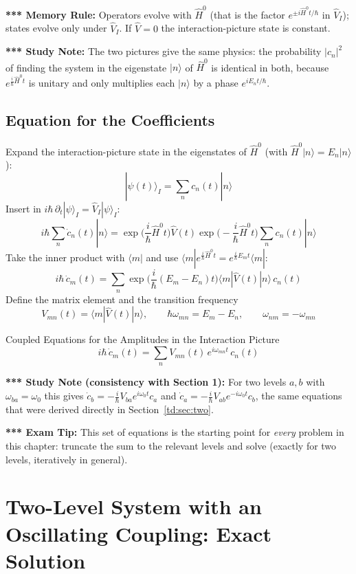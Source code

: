 \documentclass[11pt,a4paper]{article}
\begin{document}
\textbf{*** Memory Rule:} Operators evolve with $\hat H^0$ (that is the factor $e^{\pm i\hat H^0t/\hbar}$ in $\hat V_I$); states evolve only under $\hat V_I$. If $\hat V=0$ the interaction-picture state is constant.

\textbf{*** Study Note:} The two pictures give the same physics: the probability $|c_n|^2$ of finding the system in the eigenstate $|n\rangle$ of $\hat H^0$ is identical in both, because $e^{\frac i\hbar\hat H^0t}$ is unitary and only multiplies each $|n\rangle$ by a phase $e^{iE_nt/\hbar}$.

\subsection{Equation for the Coefficients}
Expand the interaction-picture state in the eigenstates of $\hat H^0$ (with $\hat H^0|n\rangle=E_n|n\rangle$):
\[
|\psi(t)\rangle_I = \sum_nc_n(t)|n\rangle
\]
Insert in $i\hbar\,\partial_t|\psi\rangle_I=\hat V_I|\psi\rangle_I$:
\[
i\hbar\sum_n\dot c_n(t)|n\rangle = \exp\Big(\frac i\hbar\hat H^0t\Big)\hat V(t)\exp\Big(-\frac i\hbar\hat H^0t\Big)\sum_nc_n(t)|n\rangle
\]
Take the inner product with $\langle m|$ and use $\langle m|e^{\frac i\hbar\hat H^0t}=e^{\frac i\hbar E_mt}\langle m|$:
\[
i\hbar\,\dot c_m(t) = \sum_n\exp\Big(\frac i\hbar(E_m-E_n)t\Big)\langle m|\hat V(t)|n\rangle\,c_n(t)
\]
Define the matrix element and the transition frequency
\[
V_{mn}(t)=\langle m|\hat V(t)|n\rangle, \qquad \hbar\omega_{mn}=E_m-E_n, \qquad \omega_{nm}=-\omega_{mn}
\]
\begin{thm}{Coupled Equations for the Amplitudes in the Interaction Picture}
\[
i\hbar\,\dot c_m(t) = \sum_nV_{mn}(t)\,e^{i\omega_{mn}t}\,c_n(t)
\]
\end{thm}

\textbf{*** Study Note (consistency with Section 1):} For two levels $a,b$ with $\omega_{ba}=\omega_0$ this gives $\dot c_b=-\frac i\hbar V_{ba}e^{i\omega_0t}c_a$ and $\dot c_a=-\frac i\hbar V_{ab}e^{-i\omega_0t}c_b$, the same equations that were derived directly in Section~\ref{td:sec:two}.

\textbf{*** Exam Tip:} This set of equations is the starting point for \textit{every} problem in this chapter: truncate the sum to the relevant levels and solve (exactly for two levels, iteratively in general).
\section{Two-Level System with an Oscillating Coupling: Exact Solution}
\label{td:sec:rabi}
\end{document}
